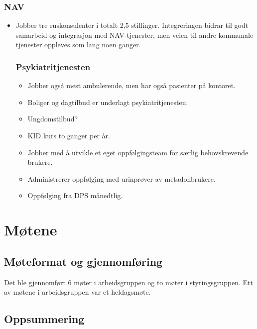 \documentclass[11pt]{report} %
\begin{document}
                    \subsection{NAV}\label{sec:org_nek_nav}
                      \begin{itemize}
                      \item Jobber tre ruskonsulenter i totalt 2,5 stillinger. Integreringen bidrar til godt samarbeid og integrasjon med NAV-tjenester, men veien til andre kommunale tjenester oppleves som lang noen ganger. 
                    \subsection{Psykiatritjenesten}\label{sec:org_nek_psyk}  
                          \begin{itemize} 
                            \item Jobber også mest ambulerende, men har også pasienter på kontoret. 
                            \item Boliger og dagtilbud er underlagt psykiatritjenesten.
                            \item Ungdomstilbud?
                            \item KID kurs to ganger per år.
                            \item Jobber med å utvikle et eget oppfølgingsteam for særlig behovskrevende brukere. 
                            \item Administrerer oppfølging med urinprøver av metadonbrukere. 
                            \item Oppfølging fra DPS månedtlig.
                          \end{itemize}
                      \end{itemize}
                      



              \chapter{Møtene}\label{chap:m_main}
                \section{Møteformat og gjennomføring}\label{sec:m_form}
                  Det ble gjennomført 6 møter i arbeidsgruppen og to møter i styringsgruppen. Ett av møtene i arbeidsgruppen var et heldagsmøte.
                \section{Oppsummering}\label{sec:m_sum}  
                  
\end{document}
